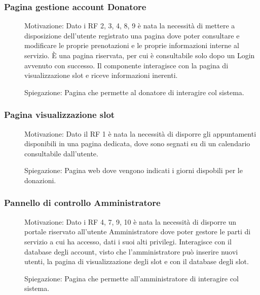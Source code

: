 \documentclass{article}
\begin{document}
\subsubsection{Pagina gestione account Donatore}
\begin{description}
	\item[] Motivazione: Dato i RF 2, 3, 4, 8, 9 è nata la necessità di mettere a disposizione dell'utente registrato una pagina dove poter consultare e modificare le proprie prenotazioni e le proprie informazioni interne al servizio. È una pagina riservata, per cui è consultabile solo dopo un Login avvenuto con successo. Il componente interagisce con la pagina di visualizzazione slot e riceve informazioni inerenti.
	\item[] Spiegazione: Pagina che permette al donatore di interagire col sistema.
\end{description}

\subsubsection{Pagina visualizzazione slot}
\begin{description}
	\item[] Motivazione: Dato il RF 1 è nata la necessità di disporre gli appuntamenti disponibili in una pagina dedicata, dove sono segnati su di un calendario consultabile dall'utente.
	\item[] Spiegazione: Pagina web dove vengono indicati i giorni dispobili per le donazioni.
\end{description}

\subsubsection{Pannello di controllo Amministratore}
\begin{description}
	\item[] Motivazione: Dato i RF 4, 7, 9, 10 è nata la necessità di disporre un portale riservato all'utente Amministratore dove poter gestore le parti di servizio a cui ha accesso, dati i suoi alti privilegi. Interagisce con il database degli account, visto che l'amministratore può inserire nuovi utenti, la pagina di visualizzazione degli slot e con il database degli slot.
	\item[] Spiegazione: Pagina che permette all'amministratore di interagire col sistema.
\end{description}
\end{document}

